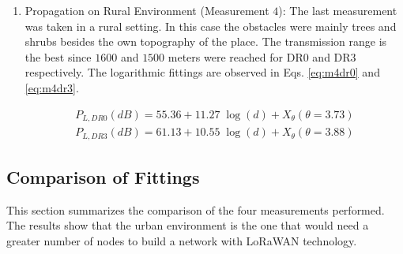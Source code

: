 \begin{enumerate}
\item Propagation on Rural Environment (Measurement $4$): The last measurement was taken in a rural setting. In this case the obstacles were mainly trees and shrubs besides the own topography of the place. The transmission range is the best since $1600$ and $1500$ meters were reached for DR$0$ and DR$3$ respectively. The logarithmic fittings are observed in Eqs. \eqref{eq:m4dr0} and \eqref{eq:m4dr3}.

\begin{eqnarray} 
P_{L,DR0}(dB) = 55.36+11.27\;\log(d)+X_\theta(\theta=3.73) \label{eq:m4dr0} \\
P_{L,DR3}(dB) = 61.13+10.55\;\log(d)+X_\theta(\theta=3.88) \label{eq:m4dr3}
\end{eqnarray}

\end{enumerate}

\subsection{Comparison of Fittings}
\label{sub:compfittings}
This section summarizes the comparison of the four measurements performed. The results show that the urban environment is the one that would need a greater number of nodes to build a network with LoRaWAN technology.

